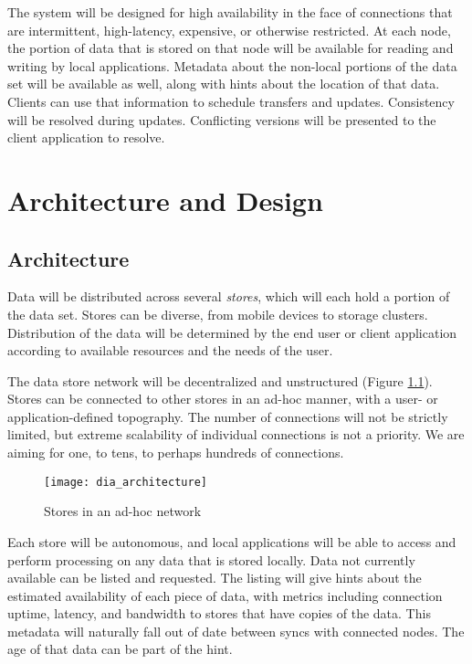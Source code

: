 \documentclass[12pt,a4paper,two-side]{book}
\newcommand{\newterm}{\textit}
\begin{document}
The system will be designed for high availability in the face of connections
that are intermittent, high-latency, expensive, or otherwise restricted. At each
node, the portion of data that is stored on that node will be available for
reading and writing by local applications. Metadata about the non-local portions
of the data set will be available as well, along with hints about the location
of that data. Clients can use that information to schedule transfers and
updates. Consistency will be resolved during updates. Conflicting versions will
be presented to the client application to resolve.


\chapter{Architecture and Design}

\section{Architecture}\label{architecture}

Data will be distributed across several \newterm{stores}, which will each hold a
portion of the data set. Stores can be diverse, from mobile devices to storage
clusters. Distribution of the data will be determined by the end user or client
application according to available resources and the needs of the user.

The data store network will be decentralized and unstructured (Figure
\ref{fig:dia_architecture}). Stores can be connected to other stores in an ad-hoc
manner, with a user- or application-defined topography. The number of
connections will not be strictly limited, but extreme scalability of individual
connections is not a priority. We are aiming for one, to tens, to perhaps
hundreds of connections.

\begin{figure}[h]
  \caption{Stores in an ad-hoc network}
  \label{fig:dia_architecture}
  \centering
    \texttt{[image: dia\_architecture]}
\end{figure}

Each store will be autonomous, and local applications will be able to access and
perform processing on any data that is stored locally. Data not currently
available can be listed and requested. The listing will give hints about the
estimated availability of each piece of data, with metrics including connection
uptime, latency, and bandwidth to stores that have copies of the data. This
metadata will naturally fall out of date between syncs with connected nodes. The
age of that data can be part of the hint.
\end{document}
